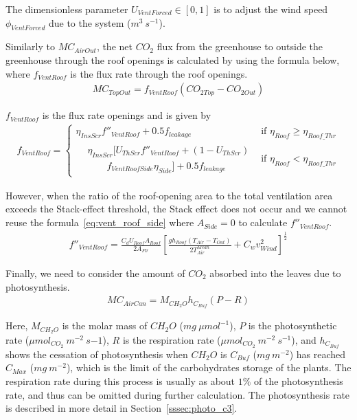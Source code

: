 \documentclass[a4paper]{article}
\numberwithin{equation}{section}
\begin{document}
The dimensionless parameter \(U_{VentForced} \in [0,1]\) is to adjust the wind speed \(\phi_{VentForced}\) due to
the system (\(m^3\ s^{-1}\)).

Similarly to \(MC_{AirOut}\), the net \(CO_2\) flux from the greenhouse to outside the greenhouse through the roof openings is calculated by using the formula below, where \(f_{VentRoof}\) is the flux rate through the roof openings.
\begin{align}
  MC_{TopOut} = f_{VentRoof}(CO_{2 Top} - CO_{2 Out})
\end{align}

\(f_{VentRoof}\) is the flux rate openings and is given by
\begin{gather}
  f_{VentRoof} =
  \begin{cases}
    \eta_{InsScr} f''_{VentRoof} + 0.5f_{leakage} & \text{if~} \eta_{Roof} \geq \eta_{Roof\_Thr} \\
    \begin{split}
      & \eta_{InsScr} [U_{ThScr}f''_{VentRoof} + (1-U_{ThScr}) \\
      & \qquad f_{VentRoofSide} \eta_{Side}] + 0.5 f_{leakage}
    \end{split}                    & \text{if~}  \eta_{Roof} < \eta_{Roof\_Thr}
  \end{cases}
\end{gather}

However, when the ratio of the roof-opening area to the total ventilation area exceeds the Stack-effect threshold, the Stack effect does not occur and we cannot reuse the formula~\eqref{eq:vent_roof_side} where \(A_{Side} = 0\) to
calculate \(f''_{VentRoof}\).
\begin{align}
  f''_{VentRoof} = \frac{C_d U_{Roof} A_{Roof}}{2A_{Flr}} {\left[\frac{gh_{Roof}(T_{Air} - T_{Out})}{2T^{Mean}_{Air}} + C_w v^2_{Wind}\right]}^{ \frac{1}{2}}
\end{align}

Finally, we need to consider the amount of \(CO_2\) absorbed into the leaves due to photosynthesis.
\begin{align}
  MC_{AirCan} = M_{CH_2O} h_{C_{Buf}} (P - R)
\end{align}

Here, \(M_{CH_2O}\) is the molar mass of \(CH_2O\) (\(mg\ \mu mol^{-1}\)), \(P\) is the photosynthetic rate (\(\mu mol_{CO_2}\ m^{-2}\ s{-1}\)), \(R\) is the respiration rate (\(\mu mol_{CO_2}\ m^{-2}\ s^{-1}\)), and \(h_{C_{Buf}}\) shows the cessation of photosynthesis when \(CH_2O\) is \(C_{Buf}\) (\(mg\ m^{-2}\)) has reached \(C_{Max}\) (\(mg\ m^{-2}\)), which is the limit of the carbohydrates storage of the plants. The respiration rate during this process is usually as about \(1\%\) of the photosynthesis rate, and thus can be omitted during further calculation. The photosynthesis rate is described in more detail in Section~\ref{sssec:photo_c3}.
\end{document}
